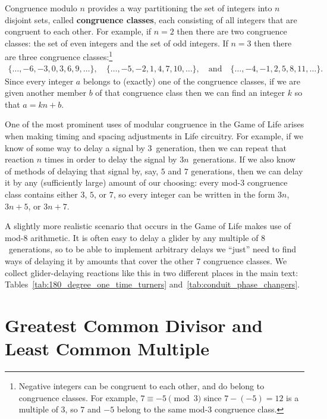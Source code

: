 \clearpage


Congruence modulo $n$ provides a way partitioning the set of integers into $n$ disjoint sets, called \textbf{congruence classes}, each consisting of all integers that are congruent to each other. For example, if $n = 2$ then there are two congruence classes: the set of even integers and the set of odd integers. If $n = 3$ then there are three congruence classes:\footnote{Negative integers can be congruent to each other, and do belong to congruence classes. For example, $7 \equiv -5 \pmod{3}$ since $7-(-5) = 12$ is a multiple of $3$, so $7$ and $-5$ belong to the same mod-$3$ congruence class.}
\begin{align*}
	\{\ldots, -6, -3, 0, 3, 6, 9, \ldots\}, \quad \{\ldots, -5, -2, 1, 4, 7, 10, \ldots\}, \quad \text{and} \quad \{\ldots, -4, -1, 2, 5, 8, 11, \ldots\}.
\end{align*}
Since every integer $a$ belongs to (exactly) one of the congruence classes, if we are given another member $b$ of that congruence class then we can find an integer $k$ so that $a = kn + b$.

One of the most prominent uses of modular congruence in the Game of Life arises when making timing and spacing adjustments in Life circuitry. For example, if we know of some way to delay a signal by $3$~generation, then we can repeat that reaction $n$ times in order to delay the signal by $3n$~generations. If we also know of methods of delaying that signal by, say, $5$ and $7$ generations, then we can delay it by any (sufficiently large) amount of our choosing: every mod-$3$ congruence class contains either $3$, $5$, or $7$, so every integer can be written in the form $3n$, $3n + 5$, or $3n + 7$.

A slightly more realistic scenario that occurs in the Game of Life makes use of mod-$8$ arithmetic. It is often easy to delay a glider by any multiple of $8$~generations, so to be able to implement arbitrary delays we ``just'' need to find ways of delaying it by amounts that cover the other $7$ congruence classes. We collect glider-delaying reactions like this in two different places in the main text: Tables~\ref{tab:180_degree_one_time_turners} and~\ref{tab:conduit_phase_changers}.


\section{Greatest Common Divisor and Least Common Multiple}\label{sec:gcd}

